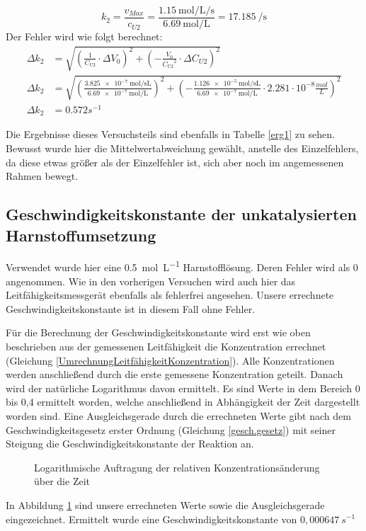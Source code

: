 $$ k_2 = \frac{v_{Max}}{c_{U2}} = \frac{\qty{1,15}{\mole\per\liter\per\second}}{\qty{6,69}{\mole\per\liter}} = \qty[per-mode=power]{17,185}{\per\second}$$
Der Fehler wird wie folgt berechnet:
\begin{align*}
 \Delta k_2 &= \sqrt{\left( \frac{1}{C_{U2}}\cdot \Delta V_0 \right)^2 + \left( - \frac{V_0}{{C_{U2}}^2} \cdot \Delta C_{U2} \right)^2}\\
 \Delta k_2 &= \sqrt{\left( \frac{\qty{3.825e-7}{\mole \per \second \liter}}{\qty{6.69e-7}{\mole \per \liter}}  \right)^2 + \left( - \frac{\qty{1.126e-5}{\mole \per \second \liter}}{\qty{6.69e-7}{\mole \per \liter}}\cdot 2.281 \cdot 10^{-8} \frac{mol}{L} \right)^2}\\
 \Delta k_2 &= 0.572 s^{-1}
\end{align*}

Die Ergebnisse dieses Versuchsteils sind ebenfalls in Tabelle \ref{erg1} zu sehen.
Bewusst wurde hier die Mittelwertabweichung gewählt, anstelle des Einzelfehlers, da diese etwas größer als der Einzelfehler ist, sich aber noch im angemessenen Rahmen bewegt.


\subsection{Geschwindigkeitskonstante der unkatalysierten Harnstoffumsetzung}
Verwendet wurde hier eine \qty{0,5}{\mole\per\liter} Harnstofflösung.
Deren Fehler wird als 0 angenommen.
Wie in den vorherigen Versuchen wird auch hier das Leitfähigkeitsmessgerät ebenfalls als fehlerfrei angesehen.
Unsere errechnete Geschwindigkeitskonstante ist in diesem Fall ohne Fehler.

Für die Berechnung der Geschwindigkeitskonstante wird erst wie oben beschrieben aus der gemessenen Leitfähigkeit die Konzentration errechnet (Gleichung \ref{UmrechnungLeitfähigkeitKonzentration}).
Alle Konzentrationen werden anschließend durch die erste gemessene Konzentration geteilt. 
Danach wird der natürliche Logarithmus davon ermittelt.
Es sind Werte in dem Bereich 0 bis 0,4 ermittelt worden, welche anschließend in Abhängigkeit der Zeit dargestellt worden sind.
Eine Ausgleichsgerade durch die errechneten Werte gibt nach dem Geschwindigkeitsgesetz erster Ordnung (Gleichung \ref{gesch.gesetz}) mit seiner Steigung die Geschwindigkeitskonstante der Reaktion an.
\begin{figure}[t]
\centering

\caption{Logarithmische Auftragung der relativen Konzentrationsänderung über die Zeit}
\label{lnWerte}
\end{figure}
In Abbildung \ref{lnWerte} sind unsere errechneten Werte sowie die Ausgleichsgerade eingezeichnet.
Ermittelt wurde eine Geschwindigkeitskonstante von $0,000647\ s^{-1}$ 
